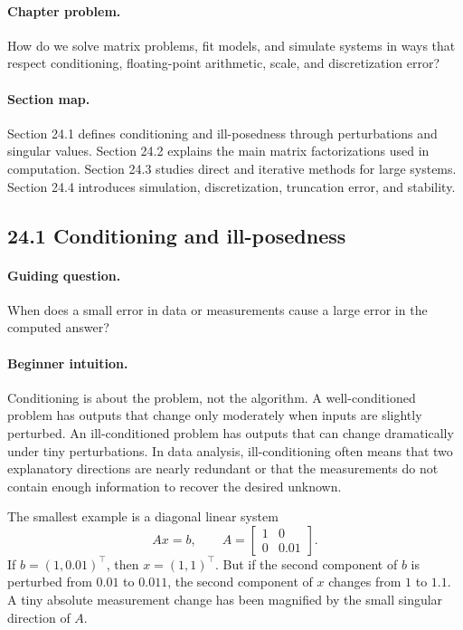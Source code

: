 \paragraph{Chapter problem.}
How do we solve matrix problems, fit models, and simulate systems in ways that respect conditioning, floating-point arithmetic, scale, and discretization error?

\paragraph{Section map.}
Section 24.1 defines conditioning and ill-posedness through perturbations and singular values. Section 24.2 explains the main matrix factorizations used in computation. Section 24.3 studies direct and iterative methods for large systems. Section 24.4 introduces simulation, discretization, truncation error, and stability.

\subsection{24.1 Conditioning and ill-posedness}

\paragraph{Guiding question.}
When does a small error in data or measurements cause a large error in the computed answer?

\paragraph{Beginner intuition.}
Conditioning is about the problem, not the algorithm. A well-conditioned problem has outputs that change only moderately when inputs are slightly perturbed. An ill-conditioned problem has outputs that can change dramatically under tiny perturbations. In data analysis, ill-conditioning often means that two explanatory directions are nearly redundant or that the measurements do not contain enough information to recover the desired unknown.

The smallest example is a diagonal linear system
\[
A x=b,\qquad
A=\begin{bmatrix}1&0\\0&0.01\end{bmatrix}.
\]
If \(b=(1,0.01)^\top\), then \(x=(1,1)^\top\). But if the second component of \(b\) is perturbed from \(0.01\) to \(0.011\), the second component of \(x\) changes from \(1\) to \(1.1\). A tiny absolute measurement change has been magnified by the small singular direction of \(A\).

